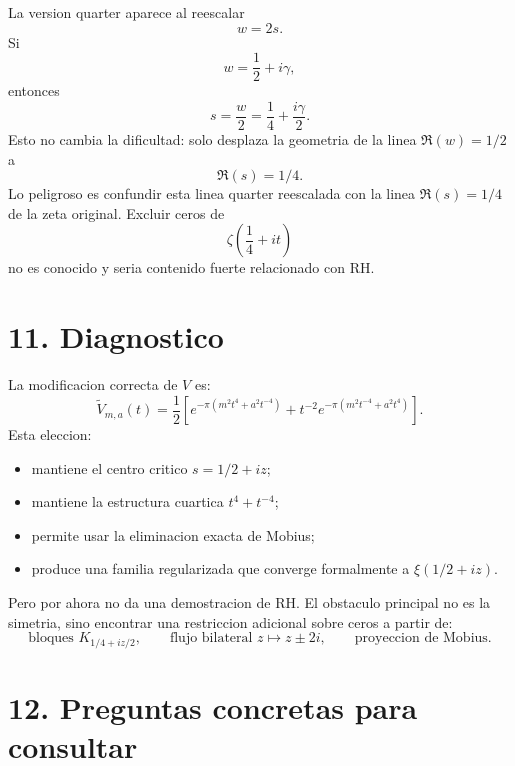 \documentclass[11pt]{article}
\begin{document}
La version quarter aparece al reescalar
\[
w=2s.
\]
Si
\[
w=\frac12+i\gamma,
\]
entonces
\[
s=\frac{w}{2}
=
\frac14+\frac{i\gamma}{2}.
\]
Esto no cambia la dificultad: solo desplaza la geometria de la linea
\(\Re(w)=1/2\) a
\[
\Re(s)=1/4.
\]
Lo peligroso es confundir esta linea quarter reescalada con la linea
\(\Re(s)=1/4\) de la zeta original. Excluir ceros de
\[
\zeta\left(\frac14+it\right)
\]
no es conocido y seria contenido fuerte relacionado con RH.

\section*{11. Diagnostico}

La modificacion correcta de \(V\) es:
\[
\boxed{
\widetilde V_{m,a}(t)
=
\frac12\left[
e^{-\pi(m^2t^4+a^2t^{-4})}
+
t^{-2}e^{-\pi(m^2t^{-4}+a^2t^4)}
\right].
}
\]
Esta eleccion:
\begin{itemize}
\item mantiene el centro critico \(s=1/2+iz\);
\item mantiene la estructura cuartica \(t^4+t^{-4}\);
\item permite usar la eliminacion exacta de Mobius;
\item produce una familia regularizada que converge formalmente a
  \(\xi(1/2+iz)\).
\end{itemize}

Pero por ahora no da una demostracion de RH. El obstaculo principal no es la
simetria, sino encontrar una restriccion adicional sobre ceros a partir de:
\[
\text{bloques }K_{1/4+iz/2},
\qquad
\text{flujo bilateral }z\mapsto z\pm2i,
\qquad
\text{proyeccion de Mobius}.
\]

\section*{12. Preguntas concretas para consultar}
\end{document}
